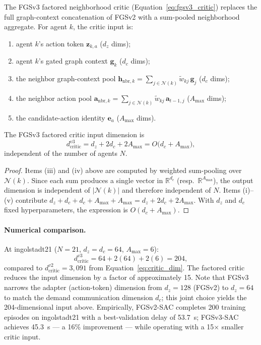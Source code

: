 The FGSv3 factored neighborhood critic (Equation~\ref{eq:fgsv3_critic}) replaces the full graph-context concatenation of FGSv2 with a sum-pooled neighborhood aggregate. For agent $k$, the critic input is:
\begin{enumerate}
  \item[(i)] agent $k$'s action token $\mathbf{z}_{k,a}$ ($d_z$ dims);
  \item[(ii)] agent $k$'s gated graph context $\mathbf{g}_k$ ($d_c$ dims);
  \item[(iii)] the neighbor graph-context pool $\mathbf{h}_{\mathrm{nbr},k} = \sum_{j \in \mathcal{N}(k)} \tilde{w}_{kj}\,\mathbf{g}_j$ ($d_c$ dims);
  \item[(iv)] the neighbor action pool $\mathbf{a}_{\mathrm{nbr},k} = \sum_{j \in \mathcal{N}(k)} \tilde{w}_{kj}\,\mathbf{a}_{t-1,j}$ ($A_{\max}$ dims);
  \item[(v)] the candidate-action identity $\mathbf{e}_a$ ($A_{\max}$ dims).
\end{enumerate}

\begin{proposition}
\label{prop:fgsv3_critic_dim}
The FGSv3 factored critic input dimension is
\begin{equation}
  d_{\mathrm{critic}}^{v3} = d_z + 2d_c + 2A_{\max} = O\!\bigl(d_c + A_{\max}\bigr),
  \label{eq:fgsv3_critic_dim}
\end{equation}
independent of the number of agents $N$.
\end{proposition}

\begin{proof}
Items (iii) and (iv) above are computed by weighted sum-pooling over $\mathcal{N}(k)$. Since each sum produces a single vector in $\mathbb{R}^{d_c}$ (resp.\ $\mathbb{R}^{A_{\max}}$), the output dimension is independent of $|\mathcal{N}(k)|$ and therefore independent of $N$. Items (i)--(v) contribute $d_z + d_c + d_c + A_{\max} + A_{\max} = d_z + 2d_c + 2A_{\max}$. With $d_z$ and $d_c$ fixed hyperparameters, the expression is $O(d_c + A_{\max})$. \qedhere
\end{proof}

\paragraph{Numerical comparison.}
At ingolstadt21 ($N=21$, $d_z=d_c=64$, $A_{\max}=6$):
\[
  d_{\mathrm{critic}}^{v3} = 64 + 2(64) + 2(6) = 204,
\]
compared to $d_{\mathrm{critic}}^{v2} = 3{,}091$ from Equation~\eqref{eq:critic_dim}. The factored critic reduces the input dimension by a factor of approximately 15. Note that FGSv3 narrows the adapter (action-token) dimension from $d_z=128$ (FGSv2) to $d_z=64$ to match the demand communication dimension $d_c$; this joint choice yields the 204-dimensional input above. Empirically, FGSv2-SAC completes 200 training episodes on ingolstadt21 with a best-validation delay of 53.7~s; FGSv3-SAC achieves 45.3~s — a 16\% improvement — while operating with a 15$\times$ smaller critic input.

